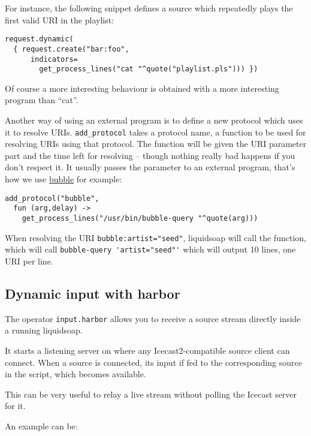 For instance, the following snippet defines a source which repeatedly plays the first valid URI in the playlist:

\begin{verbatim}
request.dynamic(
  { request.create("bar:foo",
      indicators=
        get_process_lines("cat "^quote("playlist.pls"))) })
\end{verbatim}
Of course a more interesting behaviour is obtained with a more interesting program than ``cat''.

Another way of using an external program is to define a new protocol which uses it to resolve URIs. \verb+add_protocol+ takes a protocol name, a function to be used for resolving URIs using that protocol. The function will be given the URI parameter part and the time left for resolving -- though nothing really bad happens if you don't respect it. It usually passes the parameter to an external program, that's how we use \href{bubble.html}{bubble} for example:

\begin{verbatim}
add_protocol("bubble",
  fun (arg,delay) ->
    get_process_lines("/usr/bin/bubble-query "^quote(arg)))
\end{verbatim}
When resolving the URI \verb+bubble:artist="seed"+, liquidsoap will call the function, which will call \verb+bubble-query 'artist="seed"'+ which will output 10 lines, one URI per line.

\subsection{Dynamic input with harbor}
The operator \verb+input.harbor+ allows you to receive a source stream directly inside a running liquidsoap.

It starts a listening server on where any Icecast2-compatible source client can connect. When a source is connected, its input if fed to the corresponding source in the script, which becomes available.

This can be very useful to relay a live stream without polling the Icecast server for it.

An example can be:

